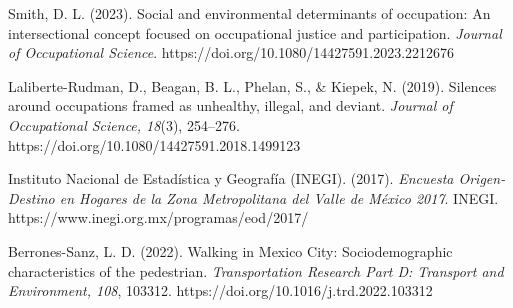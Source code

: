 \documentclass[12pt,a4paper]{article}
\begin{document}
\begin{thebibliography}{99}

Smith, D. L. (2023).
Social and environmental determinants of occupation: An intersectional concept focused on occupational justice and participation.
\textit{Journal of Occupational Science}.
https://doi.org/10.1080/14427591.2023.2212676

Laliberte-Rudman, D., Beagan, B. L., Phelan, S., \& Kiepek, N. (2019).
Silences around occupations framed as unhealthy, illegal, and deviant.
\textit{Journal of Occupational Science, 18}(3), 254--276.
https://doi.org/10.1080/14427591.2018.1499123

Instituto Nacional de Estadística y Geografía (INEGI). (2017).
\textit{Encuesta Origen-Destino en Hogares de la Zona Metropolitana del Valle de México 2017}.
INEGI. https://www.inegi.org.mx/programas/eod/2017/

Berrones-Sanz, L. D. (2022).
Walking in Mexico City: Sociodemographic characteristics of the pedestrian.
\textit{Transportation Research Part D: Transport and Environment, 108}, 103312.
https://doi.org/10.1016/j.trd.2022.103312


\end{thebibliography}
\end{document}
